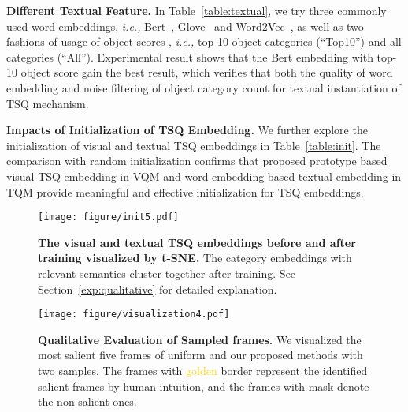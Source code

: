 \documentclass[runningheads]{llncs}
\newcommand{\tabref}[1]{Table~\ref{#1}}
\newcommand{\secref}[1]{Section~\ref{#1}}
\begin{document}
\noindent \textbf{Different Textual Feature.}
In \tabref{table:textual}, we try three commonly used word embeddings, \emph{i.e.,} Bert~\cite{bert}, Glove~\cite{glove} and Word2Vec~\cite{word2vec}, as well as two fashions of usage of object scores , \emph{i.e.,} top-10 object categories (``Top10'') and all categories (``All'').
Experimental result shows that the Bert embedding with top-10 object score gain the best result, which verifies that both the quality of word embedding and noise filtering of object category count for textual instantiation of TSQ mechanism.



\noindent\textbf{Impacts of Initialization of TSQ Embedding.}
We further explore the initialization of visual and textual TSQ embeddings in \tabref{table:init}. 
The comparison with random initialization confirms that proposed prototype based visual TSQ embedding in VQM and word embedding based textual embedding in TQM provide meaningful and effective initialization for TSQ embeddings. 


\begin{figure}[!t] \centering \texttt{[image: figure/init5.pdf]} \caption{\textbf{The visual and textual TSQ embeddings before and after training visualized by t-SNE. }The category embeddings with relevant semantics cluster together after training. See \secref{exp:qualitative} for detailed explanation. 
} \label{q_init} \end{figure}
\begin{figure}[!t] \centering \texttt{[image: figure/visualization4.pdf]} \caption{\textbf{Qualitative Evaluation of Sampled frames.} We visualized the most salient five frames of uniform and our proposed methods with two samples. The frames with \textcolor{Gold}{golden} border represent the identified salient frames by human intuition, and the frames with mask denote the non-salient ones. } \label{qualitative_example} \end{figure}
\end{document}
